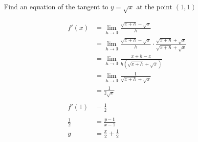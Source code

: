 \documentclass[letterpaper]{exam}
\begin{document}
\begin{questions}
      \question[10] Find an equation of the tangent to $y = \sqrt{x}$ at the point $(1, 1)$
      \begin{solution}
        \begin{align*}
          f'(x) & = \lim_{h \to 0} \frac{\sqrt{x + h} - \sqrt{x}}{h} \\
                & = \lim_{h \to 0} \frac{\sqrt{x + h} - \sqrt{x}}{h} \cdot \frac{\sqrt{x + h} + \sqrt{x}}{\sqrt{x + h} + \sqrt{x}} \\
                & = \lim_{h \to 0} \frac{x + h - x}{h \left( \sqrt{x + h} + \sqrt{x} \right)} \\
                & = \lim_{h \to 0} \frac{1}{ \sqrt{x + h} + \sqrt{x} } \\
                & = \frac{1}{2 \sqrt{x}} \\
          \\
          f'(1) &= \frac{1}{2} \\
          \\
          \frac{1}{2} & = \frac{y - 1}{x - 1} \\
          y           & = \boxed{ \frac{x}{2} + \frac{1}{2} } \\
        \end{align*}
      \end{solution}

  \end{questions}
\end{document}
